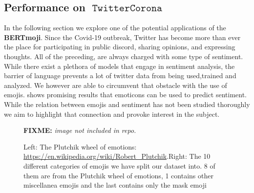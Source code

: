 \documentclass[11pt]{article}
\newcommand{\fixme}[1]{{\color{red} \textbf{FIXME:} {\textit {#1}}}}
\DeclareMathOperator{\corona}{\texttt{TwitterCorona}}
\begin{document}
\subsection{Performance on $\corona$}
In the following section we explore one of the potential applications of the \textbf{BERTmoji}.
Since the Covid-19 outbreak, Twitter has become more than ever the place for participating in public discord, 
sharing opinions, and expressing thoughts. All of the preceding, are always charged with some type of sentiment.
While there exist a plethora of models that engage in sentiment analysis, the barrier of language prevents a lot 
of twitter data from being used,trained and analyzed. We however are able to circumvent that obstacle with the use of emojis.
\cite{CAN_EMOTICONS_BE_USED_TO_PREDICT_SENTIMENT} shows promising results that emoticons can be used to predict sentiment. 
While the relation between emojis and sentiment has not been studied thoroughly we aim to highlight that connection and 
provoke interest in the subject.

\begin{figure}[ht]
    \centering
    \label{adsad}
    \fixme{image not included in repo.}
    \caption{Left: The Plutchik wheel of emotions: \url{https://en.wikipedia.org/wiki/Robert_Plutchik}.Right: The 10 different categories of emojis we have split our dataset into. 8 of them are from the Plutchik wheel of emotions, 1 contains other miscellanea emojis and the last contains only the mask emoji}%
    \label{fig:example}%
\end{figure}
\end{document}
